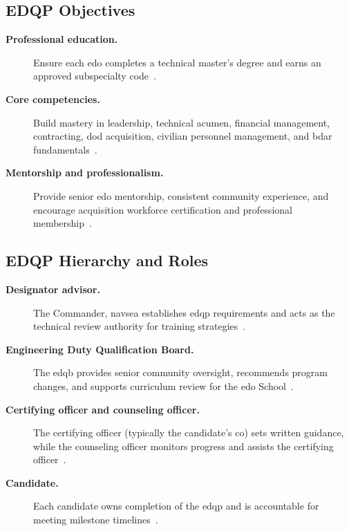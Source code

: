 \documentclass[../main.tex]{subfiles}
\begin{document}
\subsection{EDQP Objectives}
\begin{description}
  \item[\textbf{Professional education.}] Ensure each \ac{edo} completes a technical master's degree and earns
  an approved subspecialty code~\autocite{edo-5-2-2-edqp-2025}.
  \item[\textbf{Core competencies.}] Build mastery in leadership, technical acumen, financial management,
  contracting, \ac{dod} acquisition, civilian personnel management, and \ac{bdar} fundamentals~\autocite{edo-5-2-2-edqp-2025}.
  \item[\textbf{Mentorship and professionalism.}] Provide senior \ac{edo} mentorship, consistent community
  experience, and encourage acquisition workforce certification and professional membership~\autocite{edo-5-2-2-edqp-2025}.
\end{description}

\subsection{EDQP Hierarchy and Roles}
\begin{description}
  \item[\textbf{Designator advisor.}] The Commander, \ac{navsea} establishes \ac{edqp} requirements and acts
  as the technical review authority for training strategies~\autocite{edo-5-2-2-edqp-2025}.
  \item[\textbf{Engineering Duty Qualification Board.}] The \ac{edqb} provides senior community oversight,
  recommends program changes, and supports curriculum review for the \ac{edo} School~\autocite{edo-5-2-2-edqp-2025}.
  \item[\textbf{Certifying officer and counseling officer.}] The certifying officer (typically the candidate's
  \ac{co}) sets written guidance, while the counseling officer monitors progress and assists the certifying
  officer~\autocite{edo-5-2-2-edqp-2025}.
  \item[\textbf{Candidate.}] Each candidate owns completion of the \ac{edqp} and is accountable for meeting
  milestone timelines~\autocite{edo-5-2-2-edqp-2025}.
\end{description}
\end{document}

